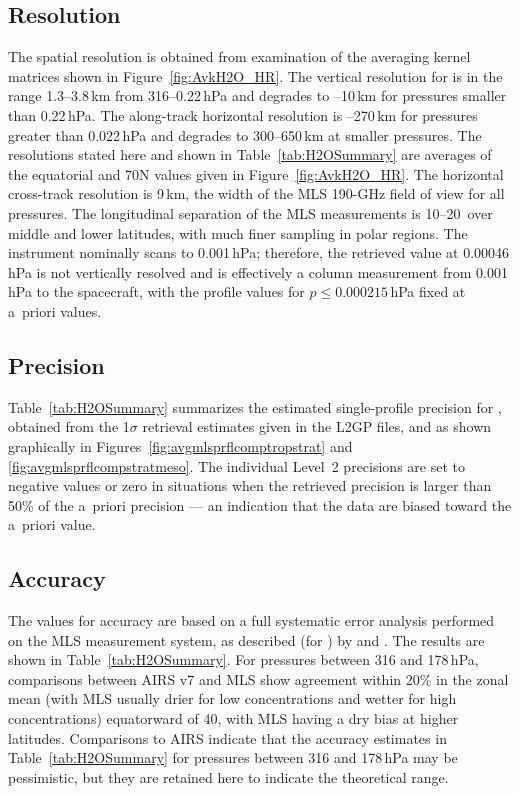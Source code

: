 \subsection{Resolution}
%

The spatial resolution is obtained from examination of the averaging kernel matrices shown in Figure~\ref{fig:AvkH2O_HR}. The vertical resolution for  is in the range 1.3--3.8\,km from 316--0.22\,hPa and degrades to --10\,km for pressures smaller than 0.22\,hPa. The along-track horizontal resolution is --270\,km for pressures greater than 0.022\,hPa and degrades to 300--650\,km at smaller pressures. The resolutions stated here and shown in Table~\ref{tab:H2OSummary} are averages of the equatorial and 70\degsym{}N values given in Figure~\ref{fig:AvkH2O_HR}. The horizontal cross-track resolution is 9\,km, the width of the MLS 190\nobreakdash-GHz field of view for all pressures. The longitudinal separation of the MLS measurements is 10\degsym--20\degsym\ over middle and lower latitudes, with much finer sampling in polar regions. The instrument nominally scans to 0.001\,hPa; therefore, the retrieved value at 0.00046\,hPa is not vertically resolved and is effectively a column measurement from 0.001\,hPa to the spacecraft, with the  profile values for $p \le 0.000215\,$hPa fixed at a~priori values.

\subsection{Precision}

Table~\ref{tab:H2OSummary} summarizes the estimated single-profile precision for \thisv {}, obtained from the 1$\sigma$ retrieval estimates given in the L2GP files, and as shown graphically in Figures~\ref{fig:avgmlsprflcomptropstrat} and \ref{fig:avgmlsprflcompstratmeso}. The individual Level~2 precisions are set to negative values or zero in situations when the retrieved precision is larger than 50\% of the a~priori precision --- an indication that the data are biased toward the a~priori value.

\subsection{Accuracy}

The values for accuracy are based on a full systematic error analysis performed on the MLS measurement system, as described (for \vii) by \citet{ReadEtal:2007} and \citet{LambertEtal:2007}. The results are shown in Table~\ref{tab:H2OSummary}. For pressures between 316 and 178\,hPa, comparisons between AIRS v7 and MLS \thisv show agreement within 20\% in the zonal mean (with MLS usually drier for low concentrations and wetter for high concentrations) equatorward of 40\degsym, with MLS having a dry bias at higher latitudes.  Comparisons to AIRS indicate that the accuracy estimates in Table~\ref{tab:H2OSummary} for pressures between 316 and 178\,hPa may be pessimistic, but they are retained here to indicate the theoretical range.

